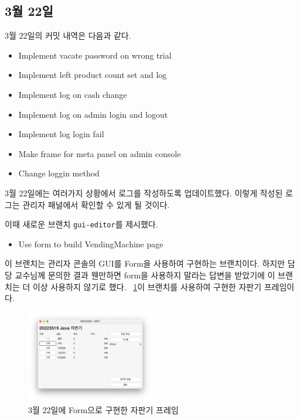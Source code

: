 \documentclass{oblivoir}
\newcommand{\figref}[1]{\figurename~\ref{#1}}
\begin{document}
    \subsection{3월 22일}

    3월 22일의 커밋 내역은 다음과 같다.
    \begin{itemize}
        \item Implement vacate password on wrong trial
        \item Implement left product count set and log
        \item Implement log on cash change
        \item Implement log on admin login and logout
        \item Implement log login fail
        \item Make frame for meta panel on admin console
        \item Change loggin method
    \end{itemize}

    3월 22일에는 여러가지 상황에서 로그를 작성하도록 업데이트했다.
    이렇게 작성된 로그는 관리자 패널에서 확인할 수 있게 될 것이다.

    이때 새로운 브랜치 \texttt{gui-editor}를 제시했다.

    \begin{itemize}
        \item Use form to build VendingMachine page
    \end{itemize}

    이 브랜치는 관리자 콘솔의 GUI를 Form을 사용하여 구현하는 브랜치이다.
    하지만 담당 교수님께 문의한 결과 웬만하면 form을 사용하지 말라는 답변을 받았기에
    이 브랜치는 더 이상 사용하지 않기로 했다.
    \figref{fig:0322-vending-machine}\은 이 브랜치를 사용하여 구현한 자판기 프레임이다.
    \begin{figure}[h]
        \centering
        \includegraphics[width=0.5\textwidth]{images/dev-snapshop/0322-vending-machine}
        \caption{3월 22일에 Form으로 구현한 자판기 프레임}
        \label{fig:0322-vending-machine}
    \end{figure}
\end{document}
